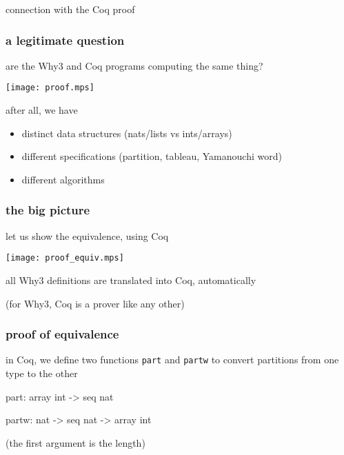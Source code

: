 \documentclass{beamer}
\let\emph\alert
\begin{document}
\begin{frame}
  \begin{center}
    \emph{connection with the Coq proof} \\
    \hrulefill
  \end{center}
\end{frame}

\begin{frame}\frametitle{a legitimate question}
  are the Why3 and Coq programs computing the same thing?

  \begin{center}
    \texttt{[image: proof.mps]}
  \end{center}

  after all, we have
  \begin{itemize}
  \item distinct data structures (nats/lists vs ints/arrays)
  \item different specifications (partition, tableau, Yamanouchi word)
  \item different algorithms
  \end{itemize}
\end{frame}

\begin{frame}\frametitle{the big picture}

  let us show the equivalence, using Coq

  \begin{center}
    \texttt{[image: proof\_equiv.mps]}
  \end{center}

  all Why3 definitions are translated into Coq, automatically

  (for Why3, Coq is a prover like any other)
\end{frame}

\begin{frame}[fragile]\frametitle{proof of equivalence}

  in Coq, we define two functions \texttt{part} and \texttt{partw} to
  convert partitions from one type to the other

\bigskip
\begin{coq}
  part: array int -> seq nat
\end{coq}
\begin{coq}
  partw: nat -> seq nat -> array int
\end{coq}
(the first argument is the length)
\end{frame}
\end{document}
